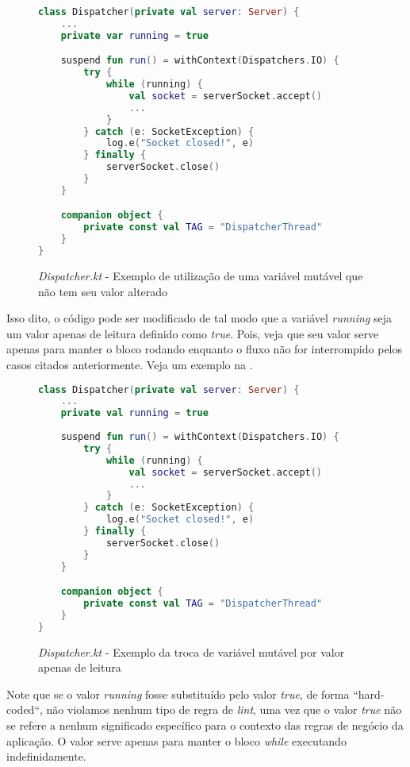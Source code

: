 \begin{figure}[H]
    \centering
    \begin{lstlisting}[language=Kotlin]
class Dispatcher(private val server: Server) {
    ...
    private var running = true

    suspend fun run() = withContext(Dispatchers.IO) {
        try {
            while (running) {
                val socket = serverSocket.accept()
                ...
            }
        } catch (e: SocketException) {
            log.e("Socket closed!", e)
        } finally {
            serverSocket.close()
        }
    }

    companion object {
        private const val TAG = "DispatcherThread"
    }
}
    \end{lstlisting}
    \caption{\textit{Dispatcher.kt} - Exemplo de utilização de uma variável mutável que não tem seu valor alterado}
    \label{fig:detekt_var_could_be_val_before_example}
\end{figure}

Isso dito, o código pode ser modificado de tal modo que a variável \textit{running} seja um valor apenas de leitura definido como \textit{true}. Pois, veja que seu valor serve apenas para manter o bloco rodando enquanto o fluxo não for interrompido pelos casos citados anteriormente. Veja um exemplo na .

\begin{figure}[H]
    \centering
    \begin{lstlisting}[language=Kotlin]
class Dispatcher(private val server: Server) {
    ...
    private val running = true
    
    suspend fun run() = withContext(Dispatchers.IO) {
        try {
            while (running) {
                val socket = serverSocket.accept()
                ...
            }
        } catch (e: SocketException) {
            log.e("Socket closed!", e)
        } finally {
            serverSocket.close()
        }
    }

    companion object {
        private const val TAG = "DispatcherThread"
    }
}
    \end{lstlisting}
    \caption{\textit{Dispatcher.kt} - Exemplo da troca de variável mutável por valor apenas de leitura}
    \label{fig:detekt_var_could_be_val_after_example}
\end{figure}

Note que se o valor \textit{running} fosse substituído pelo valor \textit{true}, de forma ``hard-coded``, não violamos nenhum tipo de regra de \textit{lint}, uma vez que o valor \textit{true} não se refere a nenhum significado específico para o contexto das regras de negócio da aplicação. O valor serve apenas para manter o bloco \textit{while} executando indefinidamente.

